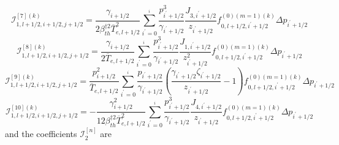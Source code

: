 \begin{equation}
\mathcal{I}_{1,l+1/2,i+1/2,j+1/2}^{\left[ 7\right] \left( k\right) }=\frac{
\gamma _{i+1/2}}{2\beta _{th}^{\dag 2}\overline{T}_{e,l+1/2}^{2}}%
\sum_{i^{\prime }=0}^{_{i}}\frac{p_{i^{\prime }+1/2}^{3}}{\gamma _{i^{\prime
}+1/2}}\frac{J_{3,i^{\prime }+1/2}}{z_{i^{\prime }+1/2}}f_{0,l+1/2,i^{\prime
}+1/2}^{\left( 0\right) \left( m=1\right) \left( k\right) }\Delta
p_{i^{\prime }+1/2}
\end{equation}
\begin{equation}
\mathcal{I}_{1,l+1/2,i+1/2,j+1/2}^{\left[ 8\right] \left( k\right) }=\frac{
\gamma _{i+1/2}}{2\overline{T}_{e,l+1/2}}\sum_{i^{\prime }=0}^{_{i}}\frac{
p_{i^{\prime }+1/2}^{3}}{\gamma _{i^{\prime }+1/2}}\frac{J_{1,i^{\prime
}+1/2}}{z_{i^{\prime }+1/2}^{2}}f_{0,l+1/2,i^{\prime }+1/2}^{\left( 0\right)
\left( m=1\right) \left( k\right) }\Delta p_{i^{\prime }+1/2}
\end{equation}
\begin{equation}
\mathcal{I}_{1,l+1/2,i+1/2,j+1/2}^{\left[ 9\right] \left( k\right) }=\frac{
p_{i+1/2}^{2}}{\overline{T}_{e,l+1/2}}\sum_{i^{\prime }=0}^{_{i}}\frac{
p_{i^{\prime }+1/2}}{\gamma _{i^{\prime }+1/2}}\left( \frac{\gamma
_{i^{\prime }+1/2}\zeta _{i^{\prime }+1/2}}{z_{i^{\prime }+1/2}}-1\right)
f_{0,l+1/2,i^{\prime }+1/2}^{\left( 0\right) \left( m=1\right) \left(
k\right) }\Delta p_{i^{\prime }+1/2}
\end{equation}
\begin{equation}
\mathcal{I}_{1,l+1/2,i+1/2,j+1/2}^{\left[ 10\right] \left( k\right) }=-\frac{
\gamma _{i+1/2}^{2}}{12\beta _{th}^{\dag 2}\overline{T}_{e,l+1/2}^{2}}
\sum_{i^{\prime }=0}^{_{i}}\frac{p_{i^{\prime }+1/2}^{3}}{\gamma _{i^{\prime
}+1/2}}\frac{J_{4,i^{\prime }+1/2}}{z_{i^{\prime }+1/2}}f_{0,l+1/2,i^{\prime
}+1/2}^{\left( 0\right) \left( m=1\right) \left( k\right) }\Delta
p_{i^{\prime }+1/2}
\end{equation}
and the coefficients $\mathcal{I}_{2}^{\left[ n\right] }$ are

